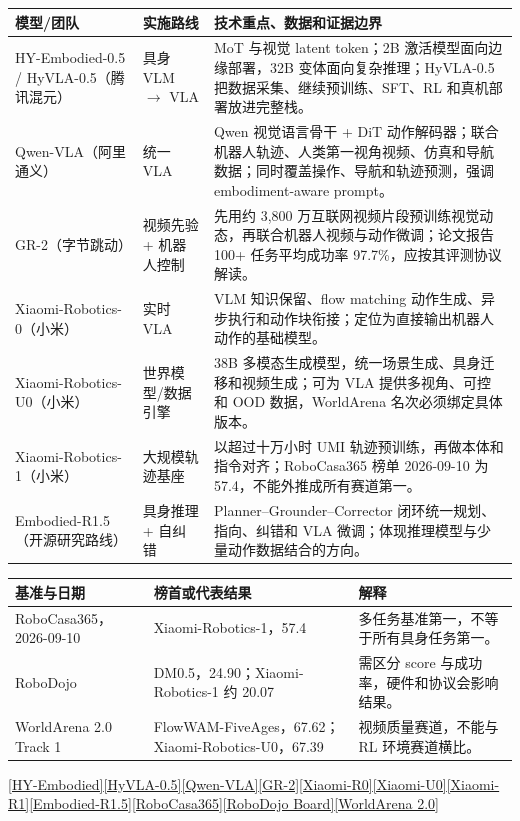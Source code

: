 \documentclass[UTF8,a4paper,11pt]{ctexart}
\begin{document}
\begin{longtable}{p{3.1cm}p{2.5cm}p{7.3cm}}
\toprule
模型/团队 & 实施路线 & 技术重点、数据和证据边界\\\midrule
HY-Embodied-0.5 / HyVLA-0.5（腾讯混元） & 具身 VLM $\rightarrow$ VLA & MoT 与视觉 latent token；2B 激活模型面向边缘部署，32B 变体面向复杂推理；HyVLA-0.5 把数据采集、继续预训练、SFT、RL 和真机部署放进完整栈。\\
Qwen-VLA（阿里通义） & 统一 VLA & Qwen 视觉语言骨干 + DiT 动作解码器；联合机器人轨迹、人类第一视角视频、仿真和导航数据；同时覆盖操作、导航和轨迹预测，强调 embodiment-aware prompt。\\
GR-2（字节跳动） & 视频先验 + 机器人控制 & 先用约 3,800 万互联网视频片段预训练视觉动态，再联合机器人视频与动作微调；论文报告 100+ 任务平均成功率 97.7\%，应按其评测协议解读。\\
Xiaomi-Robotics-0（小米） & 实时 VLA & VLM 知识保留、flow matching 动作生成、异步执行和动作块衔接；定位为直接输出机器人动作的基础模型。\\
Xiaomi-Robotics-U0（小米） & 世界模型/数据引擎 & 38B 多模态生成模型，统一场景生成、具身迁移和视频生成；可为 VLA 提供多视角、可控和 OOD 数据，WorldArena 名次必须绑定具体版本。\\
Xiaomi-Robotics-1（小米） & 大规模轨迹基座 & 以超过十万小时 UMI 轨迹预训练，再做本体和指令对齐；RoboCasa365 榜单 2026-09-10 为 57.4，不能外推成所有赛道第一。\\
Embodied-R1.5（开源研究路线） & 具身推理 + 自纠错 & Planner--Grounder--Corrector 闭环统一规划、指向、纠错和 VLA 微调；体现推理模型与少量动作数据结合的方向。\\
\bottomrule
\end{longtable}

\begin{longtable}{p{4.2cm}p{3.1cm}p{5.8cm}}
\toprule
基准与日期 & 榜首或代表结果 & 解释\\
\midrule
RoboCasa365，2026-09-10 & Xiaomi-Robotics-1，57.4 & 多任务基准第一，不等于所有具身任务第一。\\
RoboDojo & DM0.5，24.90；Xiaomi-Robotics-1 约 20.07 & 需区分 score 与成功率，硬件和协议会影响结果。\\
WorldArena 2.0 Track 1 & FlowWAM-FiveAges，67.62；Xiaomi-Robotics-U0，67.39 & 视频质量赛道，不能与 RL 环境赛道横比。\\
\bottomrule
\end{longtable}
\href{https://arxiv.org/abs/2604.07430}{[HY-Embodied]}\;\href{https://arxiv.org/abs/2606.14409}{[HyVLA-0.5]}\;\href{https://arxiv.org/abs/2605.30280}{[Qwen-VLA]}\;\href{https://arxiv.org/abs/2410.06158}{[GR-2]}\;\href{https://arxiv.org/abs/2602.12684}{[Xiaomi-R0]}\;\href{https://arxiv.org/abs/2607.11643}{[Xiaomi-U0]}\;\href{https://arxiv.org/abs/2607.15330}{[Xiaomi-R1]}\;\href{https://arxiv.org/abs/2606.11324}{[Embodied-R1.5]}\;\href{https://robocasa.ai/leaderboard.html}{[RoboCasa365]}\;\href{https://robodojo-benchmark.com/}{[RoboDojo Board]}\;\href{https://huggingface.co/spaces/WorldArena/WorldArena2.0/blob/main/RESULTS_README.md}{[WorldArena 2.0]}
\end{document}
